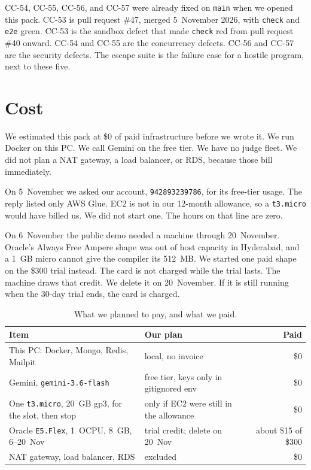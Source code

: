 \documentclass[11pt,a4paper]{article}
\begin{document}
CC-54, CC-55, CC-56, and CC-57 were already fixed on \texttt{main} when we opened this pack. CC-53 is pull request \#47, merged 5~November 2026, with \texttt{check} and \texttt{e2e} green. CC-53 is the sandbox defect that made \texttt{check} red from pull request \#40 onward. CC-54 and CC-55 are the concurrency defects. CC-56 and CC-57 are the security defects. The escape suite is the failure case for a hostile program, next to these five.

\section{Cost}
\label{sec:cost}

We estimated this pack at \$0 of paid infrastructure before we wrote it. We run Docker on this PC. We call Gemini on the free tier. We have no judge fleet. We did not plan a NAT gateway, a load balancer, or RDS, because those bill immediately.

On 5~November we asked our account, \texttt{942893239786}, for its free-tier usage. The reply listed only AWS Glue. EC2 is not in our 12-month allowance, so a \texttt{t3.micro} would have billed us. We did not start one. The hours on that line are zero.

On 6~November the public demo needed a machine through 20~November. Oracle's Always Free Ampere shape was out of host capacity in Hyderabad, and a 1~GB micro cannot give the compiler its 512~MB. We started one paid shape on the \$300 trial instead. The card is not charged while the trial lasts. The machine draws that credit. We delete it on 20~November. If it is still running when the 30-day trial ends, the card is charged.

\begin{table}[ht]
\centering
\caption{What we planned to pay, and what we paid.}
\label{tab:cost}
{\small
\begin{tabularx}{\textwidth}{@{}Y Y r@{}}
\toprule
Item & Our plan & Paid \\
\midrule
This PC: Docker, Mongo, Redis, Mailpit & local, no invoice & \$0 \\
Gemini, \texttt{gemini-3.6-flash} & free tier, keys only in gitignored env & \$0 \\
One \texttt{t3.micro}, 20~GB gp3, for the slot, then stop & only if EC2 were still in the allowance & \$0 \\
Oracle \texttt{E5.Flex}, 1~OCPU, 8~GB, 6--20~Nov & trial credit; delete on 20~Nov & about \$15 of \$300 \\
NAT gateway, load balancer, RDS & excluded & \$0 \\
\bottomrule
\end{tabularx}
}
\end{table}
\end{document}
